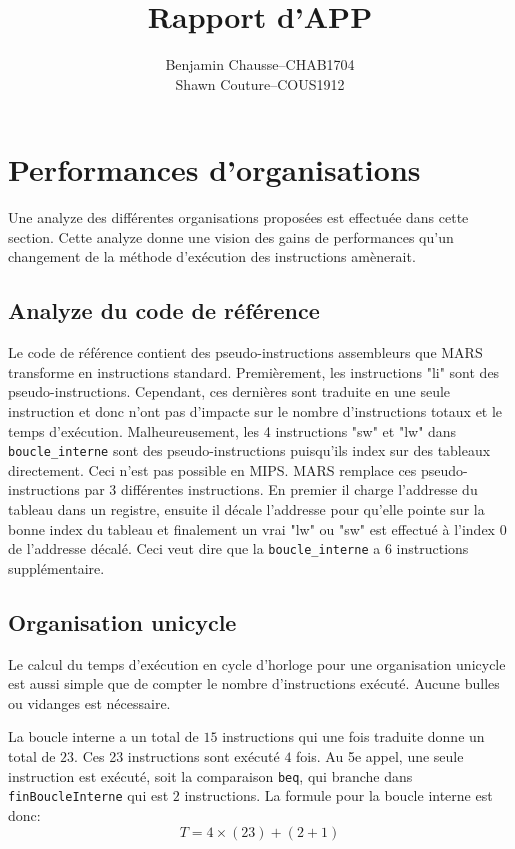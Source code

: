\documentclass[a11paper]{article}
\title{Rapport d'APP}
\author{
  \addtolength{\tabcolsep}{-0.4em}
  \begin{tabular}{rcl} %
      Benjamin Chausse & -- & CHAB1704 \\
      Shawn Couture    & -- & COUS1912 \\
  \end{tabular}
}
\newcommand{\todo}[1]{\begin{color}{Red}\textbf{TODO:} #1\end{color}}
\begin{document}
\maketitle
\newpage
\tableofcontents
\newpage

\section{Performances d'organisations}
Une analyze des différentes organisations proposées est effectuée dans cette
section. Cette analyze donne une vision des gains de performances qu'un
changement de la méthode d'exécution des instructions amènerait.

\subsection{Analyze du code de référence}

Le code de référence contient des pseudo-instructions assembleurs que MARS
transforme en instructions standard. Premièrement, les instructions "li" sont
des pseudo-instructions. Cependant, ces dernières sont traduite en une seule
instruction et donc n'ont pas d'impacte sur le nombre d'instructions totaux
et le temps d'exécution. Malheureusement, les 4 instructions "sw" et "lw"
dans \verb|boucle_interne| sont des pseudo-instructions puisqu'ils index sur
des tableaux directement. Ceci n'est pas possible en MIPS. MARS remplace ces
pseudo-instructions par 3 différentes instructions. En premier il charge
l'addresse du tableau dans un registre, ensuite il décale l'addresse pour
qu'elle pointe sur la bonne index du tableau et finalement un vrai "lw" ou
"sw" est effectué à l'index 0 de l'addresse décalé. Ceci veut dire que la
\verb|boucle_interne| a 6 instructions supplémentaire.

\subsection{Organisation unicycle}


Le calcul du temps d'exécution en cycle d'horloge pour une organisation
unicycle est aussi simple que de compter le nombre d'instructions exécuté.
Aucune bulles ou vidanges est nécessaire.

La boucle interne a un total de $15$ instructions qui une fois traduite donne
un total de $23$. Ces 23 instructions sont exécuté $4$ fois. Au 5e appel, une
seule instruction est exécuté, soit la comparaison \verb|beq|, qui branche
dans \verb|finBoucleInterne| qui est $2$ instructions. La formule pour la
boucle interne est donc: $$ T = 4\times(23)+(2+1) $$
\end{document}

